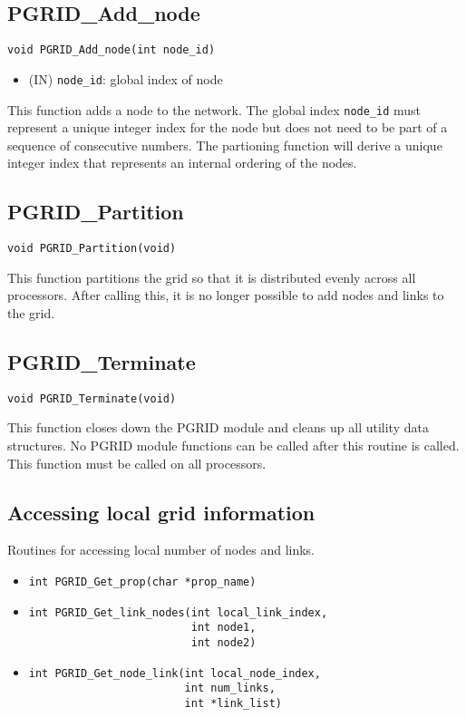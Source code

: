 \documentclass[12pt]{article}
\begin{document}
\subsection{PGRID\_Add\_node}
\begin{verbatim}
void PGRID_Add_node(int node_id)
\end{verbatim}
\begin{itemize}
\item (IN) \texttt{node\_id}: global index of node
\end{itemize}
This function adds a node to the network. The global index \texttt{node\_id}
must represent a unique integer index for the node but does not need to be part
of a sequence of consecutive numbers. The partioning function will derive a
unique integer index that represents an internal ordering of the nodes.
\subsection{PGRID\_Partition}
\begin{verbatim}
void PGRID_Partition(void)
\end{verbatim}
This function partitions the grid so that it is distributed evenly across all
processors. After calling this, it is no longer possible to add nodes and links
to the grid.
\subsection{PGRID\_Terminate}
\begin{verbatim}
void PGRID_Terminate(void)
\end{verbatim}
This function closes down the PGRID module and cleans up all utility data
structures. No PGRID module functions can be called after this routine is
called. This function must be called on all processors.

\subsection{Accessing local grid information}
Routines for accessing local number of nodes and links.
\begin{itemize}
\item \begin{verbatim}
int PGRID_Get_prop(char *prop_name)
\end{verbatim}
\item \begin{verbatim}
int PGRID_Get_link_nodes(int local_link_index,
                         int node1,
                         int node2)
\end{verbatim}
\item \begin{verbatim}
int PGRID_Get_node_link(int local_node_index,
                        int num_links,
                        int *link_list)
\end{verbatim}
\end{itemize}
\end{document}
